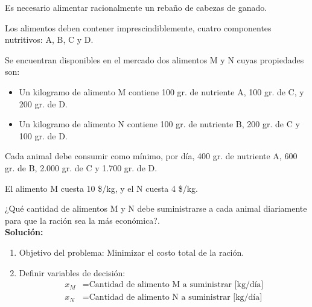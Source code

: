 \documentclass[../main.tex]{subfiles}
\begin{document}
        \begin{exercise}
            Es necesario alimentar racionalmente un rebaño de cabezas de ganado.

            Los alimentos deben contener imprescindiblemente, cuatro componentes nutritivos: A, B, C y D.

            Se encuentran disponibles en el mercado dos alimentos M y N cuyas propiedades son:
            \begin{itemize}
                \item Un kilogramo de alimento M contiene 100 gr. de nutriente A, 100 gr. de C, y 200 gr. de D.
                \item Un kilogramo de alimento N contiene 100 gr. de nutriente B, 200 gr. de C y 100 gr. de D.
            \end{itemize}

            Cada animal debe consumir como mínimo, por día, 400 gr. de nutriente A, 600 gr. de B, 2.000 gr. de C y 1.700 gr. de D.

            El alimento M cuesta 10 \$/kg, y el N cuesta 4 \$/kg.

            ¿Qué cantidad de alimentos M y N debe suministrarse a cada animal diariamente para que la ración sea la más económica?.\\

            \textbf{Solución:}
            \begin{enumerate}
                \item Objetivo del problema: Minimizar el costo total de la ración.
                \item Definir variables de decisión:
                    \begin{equation}
                        \begin{split}
                            x_M &= \text{Cantidad de alimento M a suministrar [kg/día]} \\
                            x_N &= \text{Cantidad de alimento N a suministrar [kg/día]} \\
                        \end{split}
                    \end{equation}


\end{enumerate}
\end{exercise}
\end{document}
